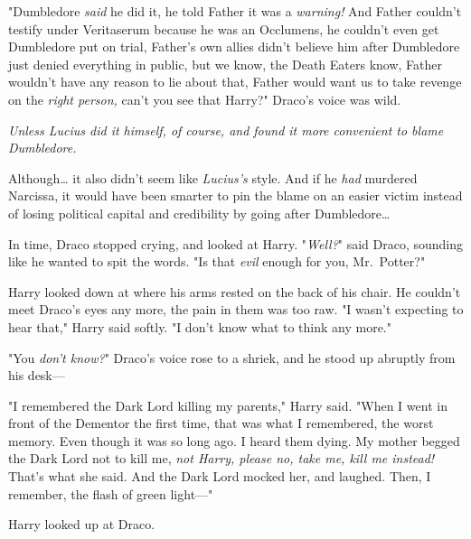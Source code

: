 "Dumbledore \emph{said} he did it, he told Father it was a \emph{warning!} And 
Father couldn't testify under Veritaserum because he was an Occlumens, he 
couldn't even get Dumbledore put on trial, Father's own allies didn't believe 
him after Dumbledore just denied everything in public, but we know, the Death 
Eaters know, Father wouldn't have any reason to lie about that, Father would 
want us to take revenge on the \emph{right person,} can't you see that Harry?" 
Draco's voice was wild.

\emph{Unless Lucius did it himself, of course, and found it more convenient to 
blame Dumbledore.}

Although{\ldots} it also didn't seem like \emph{Lucius's} style. And if he 
\emph{had} murdered Narcissa, it would have been smarter to pin the blame on an 
easier victim instead of losing political capital and credibility by going 
after Dumbledore{\ldots}

In time, Draco stopped crying, and looked at Harry. "\emph{Well?}" said Draco, 
sounding like he wanted to spit the words. "Is that \emph{evil} enough for you, 
Mr.~Potter?"

Harry looked down at where his arms rested on the back of his chair. He 
couldn't meet Draco's eyes any more, the pain in them was too raw. "I wasn't 
expecting to hear that," Harry said softly. "I don't know what to think any 
more."

"You \emph{don't know?}" Draco's voice rose to a shriek, and he stood up 
abruptly from his desk---

"I remembered the Dark Lord killing my parents," Harry said. "When I went in 
front of the Dementor the first time, that was what I remembered, the worst 
memory. Even though it was so long ago. I heard them dying. My mother begged 
the Dark Lord not to kill me, \emph{not Harry, please no, take me, kill me 
instead!} That's what she said. And the Dark Lord mocked her, and laughed. 
Then, I remember, the flash of green light---"

Harry looked up at Draco.

